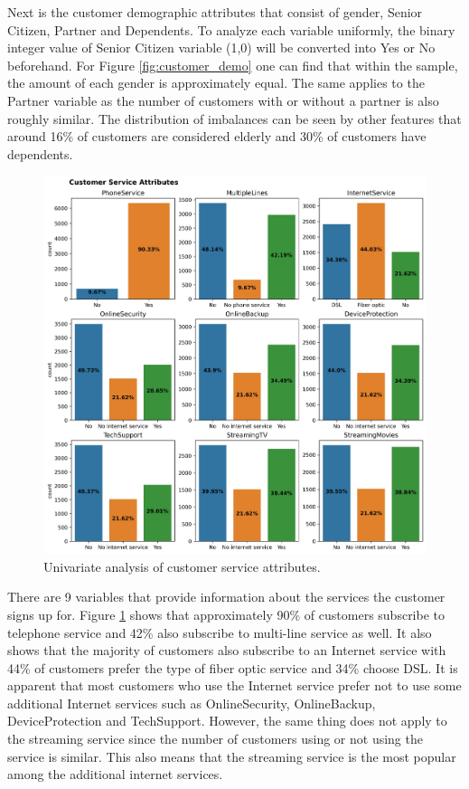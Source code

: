 Next is the customer demographic attributes that consist of gender, Senior Citizen, Partner and Dependents. To analyze each variable uniformly, the binary integer value of Senior Citizen variable (1,0) will be converted into Yes or No beforehand.  For Figure \ref{fig:customer_demo} one can find that within the sample, the amount of each gender is approximately equal. The same applies to the Partner variable as the number of customers with or without a partner is also roughly similar. The distribution of imbalances can be seen by other features that around 16\% of customers are considered elderly and 30\% of customers have dependents.

\begin{figure}[tbph]
	\centering
	\includegraphics[width=1\linewidth]{figures/customer_service}
	\caption{Univariate analysis of customer service attributes.}
	\label{fig:customer_service}
\end{figure}

There are 9 variables that provide information about the services the customer signs up for. Figure \ref{fig:customer_service} shows that approximately 90\% of customers subscribe to telephone service and 42\% also subscribe to multi-line service as well. It also shows that the majority of customers also subscribe to an Internet service with 44\% of customers prefer the type of fiber optic service and 34\% choose DSL. It is apparent that most customers who use the Internet service prefer not to use some additional Internet services such as OnlineSecurity, OnlineBackup, DeviceProtection and TechSupport. However, the same thing does not apply to the streaming service since the number of customers using or not using the service is similar. This also means that the streaming service is the most popular among the additional internet services.

